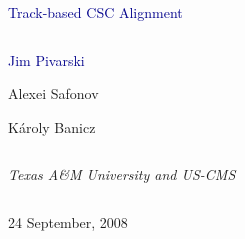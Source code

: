 \documentclass[compress]{beamer}
\begin{document}
\begin{frame}
\vfill
\begin{center}
\textcolor{darkblue}{\Large Track-based CSC Alignment}

\vfill
\begin{columns}
\begin{center}
\large
\textcolor{darkblue}{Jim Pivarski}

\vspace{0.2 cm}
Alexei Safonov

\vspace{0.2 cm}
K\'aroly Banicz
\end{center}
\end{columns}

\begin{columns}
\begin{center}
\scriptsize
{\it Texas A\&M University and US-CMS}
\end{center}
\end{columns}

\vfill
24 September, 2008

\end{center}
\end{frame}

\end{document}
